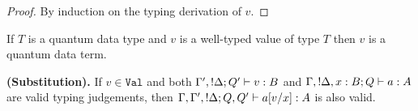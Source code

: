 \documentclass[twoside]{article}
\begin{document}
\begin{proof}
By induction on the typing derivation of $v$.
\end{proof}

\begin{corollary}
\label{typed_qd_term}
If $T$ is a quantum data type and $v$ is a well-typed value of type $T$ then $v$ is 
a quantum data term.
\end{corollary}

\begin{lemma}
{\bf (Substitution).}
\label{substitution}
If $v\in\mathtt{Val}$ and both $\Gamma',{!}\Delta;Q' \vdash v:B$ and 
$\Gamma,{!}\Delta,x:B;Q \vdash a:A$ are valid typing judgements, 
then $\Gamma,\Gamma',{!}\Delta;Q,Q' \vdash a[v/x]:A$ is also valid.
\end{lemma}
\end{document}
